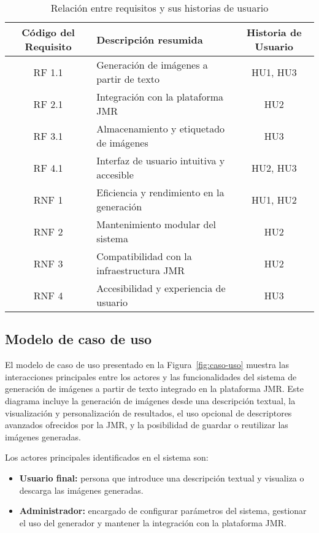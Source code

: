 \begin{table}[H]
    \centering
    \renewcommand{\arraystretch}{1.4}
    \begin{tabular}{|c|p{6cm}|c|}
        \hline
        \rowcolor{gray!30}
        \textbf{Código del Requisito} & \textbf{Descripción resumida} & \textbf{Historia de Usuario} \\
        \hline
        RF 1.1 & Generación de imágenes a partir de texto & HU1, HU3 \\
        \hline
        RF 2.1 & Integración con la plataforma JMR & HU2 \\
        \hline
        RF 3.1 & Almacenamiento y etiquetado de imágenes & HU3 \\
        \hline
        RF 4.1 & Interfaz de usuario intuitiva y accesible & HU2, HU3 \\
        \hline
        RNF 1 & Eficiencia y rendimiento en la generación & HU1, HU2 \\
        \hline
        RNF 2 & Mantenimiento modular del sistema & HU2 \\
        \hline
        RNF 3 & Compatibilidad con la infraestructura JMR & HU2 \\
        \hline
        RNF 4 & Accesibilidad y experiencia de usuario & HU3 \\
        \hline
    \end{tabular}
    \caption{Relación entre requisitos y sus historias de usuario}
    \label{tab:req-hu}
\end{table}


\subsection{Modelo de caso de uso}
El modelo de caso de uso presentado en la Figura~\ref{fig:caso-uso} muestra las interacciones principales entre los actores y las funcionalidades del sistema de generación de imágenes a partir de texto integrado en la plataforma JMR. Este diagrama incluye la generación de imágenes desde una descripción textual, la visualización y personalización de resultados, el uso opcional de descriptores avanzados ofrecidos por la JMR, y la posibilidad de guardar o reutilizar las imágenes generadas.

Los actores principales identificados en el sistema son:
\begin{itemize}
    \item \textbf{Usuario final:} persona que introduce una descripción textual y visualiza o descarga las imágenes generadas.
    \item \textbf{Administrador:} encargado de configurar parámetros del sistema, gestionar el uso del generador y mantener la integración con la plataforma JMR.
\end{itemize}


